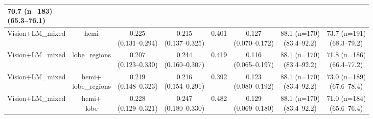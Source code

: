 \documentclass[FCD_GNN.tex]{subfiles}
\begin{document}
\begin{table}[H]
\begin{tabular}{lccccccc}
\makecell{70.7 (n=183) \\ (65.3--76.1)} \\
\hline
Vision+LM\_mixed & 
hemi &
\makecell{0.225 \\ (0.131--0.294)} &
\makecell{0.215 \\ (0.137--0.325)} &
0.401 &
\makecell{0.127 \\ (0.070--0.172)} &
\makecell{88.1 (n=170) \\ (83.4--92.2)} &
\makecell{\colorbox{cyan!15}{73.7 (n=191)} \\ (68.3--79.2)} \\
\hline
Vision+LM\_mixed & 
lobe\_regions &
\makecell{0.207 \\ (0.123--0.330)} &
\makecell{\colorbox{cyan!15}{0.244} \\ (0.160--0.307)} &
\colorbox{orange!15}{0.419} &
\makecell{0.116 \\ (0.065--0.197)} &
\makecell{88.1 (n=170) \\ (83.4--92.2)} &
\makecell{71.8 (n=186) \\ (66.4--77.2)} \\
\hline
Vision+LM\_mixed & 
\makecell{hemi+ \\lobe\_regions} &
\makecell{0.219 \\ (0.148--0.323)} &
\makecell{\colorbox{orange!15}{0.216} \\ (0.154--0.291)} &
0.392 &
\makecell{0.123 \\ (0.080--0.192)} &
\makecell{88.1 (n=170) \\ (83.4--92.2)} &
\makecell{\colorbox{orange!15}{73.0 (n=189)} \\ (67.6--78.4)} \\
\hline
Vision+LM\_mixed & 
\makecell{hemi+ \\lobe} &
\makecell{0.228 \\ (0.129--0.321)} &
\makecell{\colorbox{green!15}{0.247} \\ (0.180--0.330)} &
\colorbox{cyan!15}{0.482} &
\makecell{0.129 \\ (0.069--0.180)} &
\makecell{88.1 (n=170) \\ (83.4--92.2)} &
\makecell{71.0 (n=184) \\ (65.6--76.4)} \\

\end{tabular}
\end{table}
\end{document}
